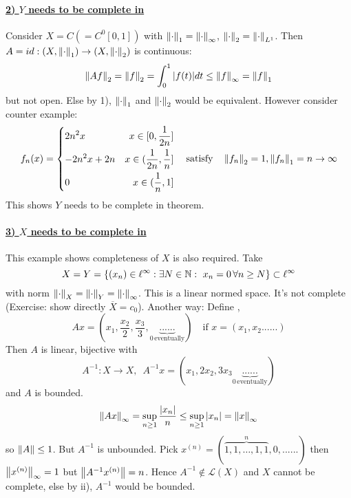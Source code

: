 \documentclass{article}
\begin{document}
\paragraph{\underline{\textbf{2) $Y$ needs to be complete in }}}
\begin{example}[Completeness of $Y$]\nl
Consider $X=C(=C^0[0,1])$ with $\left\|{\cdot}\right\|_1=\left\|{\cdot}\right\|_\infty$, $\left\|{\cdot}\right\|_2=\left\|{\cdot}\right\|_{L^1}$. Then $A=id:(X,\left\|{\cdot}\right\|_1)\to(X,\left\|{\cdot}\right\|_2)$ is continuous:
$$
\left\|{Af}\right\|_2
=\left\|{f}\right\|_2
=\int_0^1|f(t)|dt
\leq\left\|{f}\right\|_\infty
=\left\|{f}\right\|_1
$$
but not open. Else by 1),  $\left\|{\cdot}\right\|_1$ and $\left\|{\cdot}\right\|_2$ would be equivalent. However consider counter example:
\begin{equation}\nonumber
f_n(x)=\left\{
\begin{aligned}
    &{2n^2x} &x\in[0,\frac{1}{2n}]\\
    &{-2n^2x+2n} &x\in(\frac{1}{2n},\frac{1}{n}]\\
    &0 &x\in(\frac{1}{n},1]\\
\end{aligned}
\right.\quad\text{satisfy}\quad\left\|{f_n}\right\|_2=1,\left\|{f_n}\right\|_1=n\to\infty
\end{equation}
This shows $Y$ needs to be complete in theorem.
\end{example}

\paragraph{\underline{\textbf{3) $X$ needs to be complete in }}}
\begin{example}[Completeness of $X$]\nl
This example shows completeness of $X$ is also required.
Take 
$$
X=Y=\{(x_n)\in\ell^\infty:\exists N \in \natu: \ x_n=0\,\forall n\geq N\}\subset\ell^\infty
$$
with norm $\left\|{\cdot}\right\|_X=\left\|{\cdot}\right\|_Y=\left\|{\cdot}\right\|_\infty$. This is a linear normed space. It's not complete (Exercise: show directly $\overline{X}=c_0$). Another way:
Define , 
$$
Ax=(x_1,\frac{x_2}{2},\frac{x_3}{3},\underbrace{......}_{0\,\text{eventually}})\quad \text{if} \,\,x=(x_1,x_2......)
$$
Then $A$ is linear, bijective with 
$$
A^{-1}:X\to X, \,\,\,A^{-1}x=(x_1,2x_2,3x_3\underbrace{......}_{0\,\text{eventually}})
$$
and $A$ is bounded. 
$$
\left\|{Ax}\right\|_\infty=\sup_{n\geq1}\frac{|x_n|}{n}\leq\sup_{n\geq1}|x_n|=\left\|{x}\right\|_\infty
$$
so $\left\|{A}\right\|\leq1$. But $A^{-1}$ is unbounded. 
Pick $x^{(n)}=(\overbrace{1,1,\ldots, 1,1}^{n},0,......)$ then $\left\|{x^{(n)}}\right\|_\infty=1$ but $\left\|{A^{-1}x^{(n)}}\right\|=n$. Hence $A^{-1}\not\in\mathcal{L}(X)$ and $X$ cannot be complete, else by  ii), $A^{-1}$ would be bounded.
\end{example}
\end{document}
